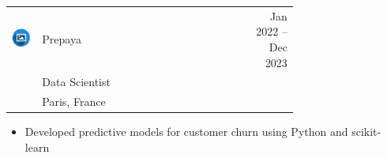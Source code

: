 \documentclass{article}
\begin{document}
\begin{paracol}{2}
\colorbox{maincolor}{%
  \begin{minipage}{\linewidth}
    \begin{tabular}{@{}lp{0.72\linewidth}r}
      \begin{minipage}{0.05\linewidth}
        \includegraphics[width=\linewidth]{picon.png}
      \end{minipage} & 
      {Prepaya} &  
      {\footnotesize {Jan 2022} { -- Dec 2023} } \\[-10pt]
      & {\color{sidetext}Data Scientist} & \\
      & {\small {Paris, France} } & \\
    \end{tabular}
\begin{itemize}
    \item Developed predictive models for customer churn using Python and scikit-learn
\end{itemize}
  \end{minipage}%
}

~ \\[-6pt]


\end{paracol}
\end{document}
